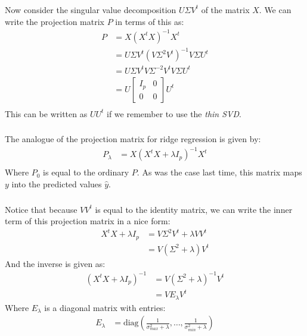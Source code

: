 \begin{frame}[fragile] \frametitle{}

Now consider the singular value decomposition $U\Sigma V^t$ of
the matrix $X$. \pause We can write the projection matrix $P$ in terms
of this as:
\begin{align*}
P &= X (X^t X)^{-1} X^t \\
&= U \Sigma V^t (V \Sigma^2 V^t)^{-1} V \Sigma U^t \\
&= U \Sigma V^t V \Sigma^{-2} V^t V \Sigma U^t \\
&= U \left[\begin{array}{cc} I_{p} & 0 \\ 0 & 0 \end{array}\right] U^t \\
\end{align*}
\pause This can be written as $UU^t$ if we remember to use the
\textit{thin SVD}.

\end{frame}

\begin{frame}[fragile] \frametitle{}

The analogue of the projection matrix for ridge regression
is given by:
\begin{align*}
P_{\lambda} &= X (X^t X + \lambda I_p)^{-1} X^t \\
\end{align*}
Where $P_{0}$ is equal to the ordinary $P$. \pause As was
the case last time, this matrix maps $y$ into the predicted
values $\hat{y}$.

\end{frame}

\begin{frame}[fragile] \frametitle{}

Notice that because $VV^t$ is equal to the identity matrix, we
can write the inner term of this projection matrix in a nice form:
\begin{align*}
X^t X + \lambda I_p &= V \Sigma^2 V^t + \lambda V V^t \\
&= V(\Sigma^2 + \lambda)V^t
\end{align*}
\pause And the inverse is given as:
\begin{align*}
(X^t X + \lambda I_p)^{-1}
&= V(\Sigma^2 + \lambda)^{-1}V^t \\
&= V E_{\lambda} V^t
\end{align*}
\pause Where $E_{\lambda}$ is a diagonal matrix with entries:
\begin{align*}
E_{\lambda} &=
\text{diag} \left( \frac{1}{\sigma^2_{max} + \lambda}, \ldots, \frac{1}{\sigma^2_{min} + \lambda}\right)
\end{align*}

\end{frame}

